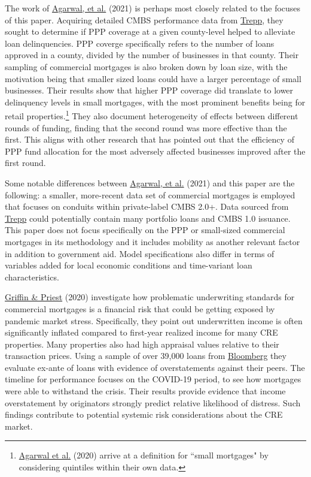 \documentclass[11pt]{article} %
\begin{document}
The work of \hyperlink{Agarwal}{Agarwal, et al.} (2021) is perhaps most closely related to the focuses of this paper. Acquiring detailed CMBS performance data from \href{https://www.trepp.com/}{Trepp}, they sought to determine if PPP coverage at a given county-level helped to alleviate loan delinquencies. PPP coverge specifically refers to the number of loans approved in a county, divided by the number of businesses in that county. Their sampling of commercial mortgages is also broken down by loan size, with the motivation being that smaller sized loans could have a larger percentage of small businesses. Their results show that higher PPP coverage did translate to lower delinquency levels in small mortgages, with the most prominent benefits being for retail properties.\footnote{\hyperlink{Agarwal}{Agarwal et al.} (2020) arrive at a definition for ``small mortgages" by considering quintiles within their own data.} They also document heterogeneity of effects between different rounds of funding, finding that the second round was more effective than the first. This aligns with other research that has pointed out that the efficiency of PPP fund allocation for the most adversely affected businesses improved after the first round. 

Some notable differences between \hyperlink{Agarwal}{Agarwal, et al.} (2021) and this paper are the following: a smaller, more-recent data set of commercial mortgages is employed that focuses on conduits within private-label CMBS 2.0+. Data sourced from \href{https://www.trepp.com/}{Trepp} could potentially contain many portfolio loans and CMBS 1.0 issuance. This paper does not focus specifically on the PPP or small-sized commercial mortgages in its methodology and it includes mobility as another relevant factor in addition to government aid. Model specifications also differ in terms of variables added for local economic conditions and time-variant loan characteristics.  

\hyperlink{Griffin}{Griffin \& Priest} (2020) investigate how problematic underwriting standards for commercial mortgages is a   financial risk that could be getting exposed by pandemic market stress. Specifically, they point out underwritten income is often significantly inflated compared to first-year realized income for many CRE properties. Many properties also had high appraisal values relative to their transaction prices. Using a sample of over 39,000 loans from \href{https://www.bloomberg.com/}{Bloomberg}
they evaluate ex-ante of loans with evidence of overstatements against their peers. The timeline for performance focuses on the COVID-19 period, to see how mortgages were able to withstand the crisis. Their results  provide evidence that income overstatement by originators strongly predict relative likelihood of distress. Such findings contribute to potential systemic risk considerations about the CRE market. 
\end{document}
